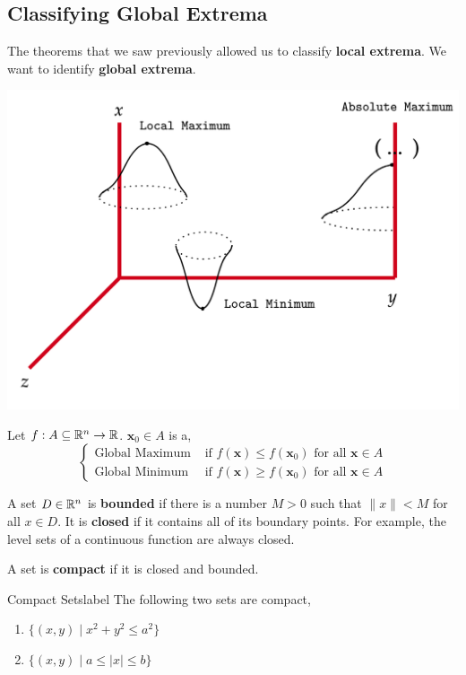 \subsection{Classifying Global Extrema}
The theorems that we saw previously allowed us to classify \textbf{local extrema}. We want to identify \textbf{global extrema}.
\begin{center}
    \includegraphics[width=0.7\linewidth]{figures/wk-4/fig-48.png}
\end{center}

\begin{defn}
    Let $f: A \subseteq \mathbb{R}^n \rightarrow \mathbb{R}$. $\mathbf{x}_0 \in A$ is a,
    \[
    \begin{cases}
        \text{Global Maximum} & \text{ if } f(\mathbf{x}) \leq f(\mathbf{x}_0)  \text{ for all } \mathbf{x} \in A \\
        \text{Global Minimum} & \text{ if } f(\mathbf{x}) \geq f(\mathbf{x}_0) \text{ for all } \mathbf{x} \in A
    \end{cases}
    \]
    
\end{defn}

\begin{marginfigure}
    A set $D \in \mathbb{R}^n$ is \textbf{bounded} if there is a number $M > 0$ such that $\|x\| < M$ for all $x \in D$. It is \textbf{closed} if it contains all of its boundary points. For example, the level sets of a continuous function are always closed.
\end{marginfigure}

\begin{defn}[Compact]
    A set is \textbf{compact} if it is closed and bounded.
\end{defn}

\begin{ex}{Compact Sets}{label}
    The following two sets are compact,
    \begin{enumerate}
        \item $\{(x,y) \mid x^2+y^2 \leq a^2\}$
        \item $\{(x,y) \mid a \leq |x| \leq b\}$
    \end{enumerate}
\end{ex}


